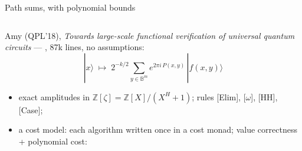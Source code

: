 \begin{frame}{Path sums, with polynomial bounds \New}
\begin{columns}[c]
\begin{column}{0.52\textwidth}
\renewcommand{\AgdaCodeStyle}{\scriptsize}
\small Amy (QPL'18), \emph{Towards large-scale functional verification of
universal quantum circuits} --- , 87k lines, \alert{no assumptions}:
\[
  |x\rangle \;\mapsto\; 2^{-k/2}\!\!\sum_{y\in\mathbb{B}^m}\! e^{2\pi i\,P(x,y)}\,|f(x,y)\rangle
\]
\vspace{-8pt}
\begin{itemize}
  \small
  \item exact amplitudes in $\mathbb{Z}[\zeta]=\mathbb{Z}[X]/(X^H+1)$;
        rules [Elim], [$\omega$], [HH], [Case];
  \item a \alert{cost model}: each algorithm written once in a cost monad;
        value correctness + polynomial cost:
\end{itemize}
\begin{code}%
\>[0]\AgdaSpace{}%
\AgdaSpace{}%
\AgdaSymbol{\{}\AgdaSpace{}%
\AgdaSymbol{:}\AgdaSpace{}%
\AgdaSymbol{\}}\AgdaSpace{}%
\AgdaSymbol{(}\AgdaSpace{}%
\AgdaSymbol{:}\AgdaSpace{}%
\AgdaSpace{}%
\AgdaSymbol{)}\AgdaSpace{}%
\AgdaSymbol{:}\AgdaSpace{}%
\AgdaSpace{}%
\<%
\\
\>[0][@{}l@{\AgdaIndent{0}}]%
\>[2]\<%
\\
\>[2][@{}l@{\AgdaIndent{0}}]%
\>[4]%
\>[15]\AgdaSymbol{:}\AgdaSpace{}%
\AgdaSpace{}%
\AgdaSymbol{(}\AgdaSpace{}%
\AgdaSymbol{)}\AgdaSpace{}%
\AgdaSpace{}%
\AgdaSpace{}%
\AgdaSpace{}%
\AgdaSpace{}%
\AgdaSpace{}%
\AgdaSpace{}%
\AgdaSpace{}%
\<%
\\
%
\>[4]\AgdaSpace{}%
\AgdaSymbol{:}\AgdaSpace{}%
\AgdaSpace{}%
\AgdaSymbol{(}\AgdaSpace{}%
\AgdaSymbol{)}\AgdaSpace{}%
\AgdaSpace{}%
\AgdaSpace{}%
\AgdaSpace{}%
\AgdaSymbol{(}\AgdaSpace{}%
\AgdaSymbol{)}\<%

\end{code}
\end{column}
\end{columns}
\end{frame}
